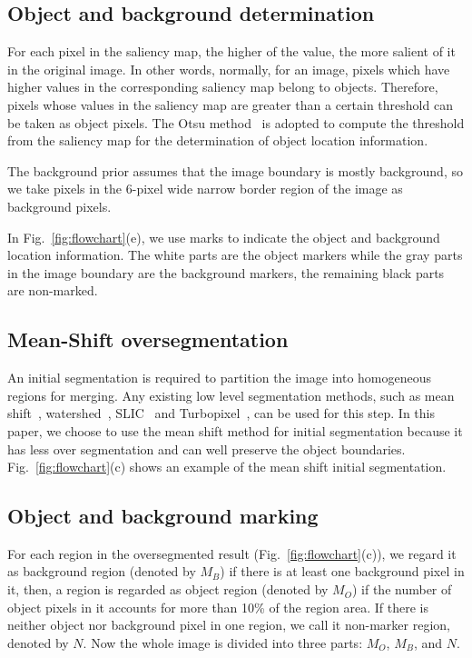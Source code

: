 \documentclass[conference]{IEEEtran}
\begin{document}
\subsection{Object and background determination}

For each pixel in the saliency map, the higher of the value, the more salient of it in the original image. In other words, normally, for an image, pixels which have higher values in the corresponding saliency map belong to objects. Therefore, pixels whose values in the saliency map are greater than a certain threshold can be taken as object pixels. The Otsu method~\cite{otsu1975threshold} is adopted to compute the threshold from the saliency map for the determination of object location information. 

The background prior assumes that the image boundary is mostly background, so we take pixels in the $6$-pixel wide narrow border region of the image as background pixels.

In Fig.~\ref{fig:flowchart}(e), we use marks to indicate the object and background location information. The white parts are the object markers while the gray parts in the image boundary are the background markers, the remaining black parts are non-marked. 

\subsection{Mean-Shift oversegmentation}

An initial segmentation is required to partition the image into homogeneous regions for merging. Any existing low level segmentation methods, such as mean shift~\cite{cheng1995mean,comaniciu2002mean}, watershed~\cite{vincent1991watersheds}, SLIC~\cite{achanta2012slic} and Turbopixel~\cite{levinshtein2009turbopixels}, can be used for this step. In this paper, we choose to use the mean shift method for initial segmentation because it has less over segmentation and can well preserve the object boundaries. Fig.~\ref{fig:flowchart}(c) shows an example of the mean shift initial segmentation.

\subsection{Object and background marking}

For each region in the oversegmented result (Fig.~\ref{fig:flowchart}(c)),  we regard it as background region (denoted by $M_B$) if there is at least one background pixel in it, then, a region is regarded as object region (denoted by $M_O$) if the number of object pixels in it accounts for more than 10\% of the region area. If there is neither object nor background pixel in one region, we call it non-marker region, denoted by $N$. Now the whole image is divided into three parts: $M_O$, $M_B$, and $N$.
\end{document}
